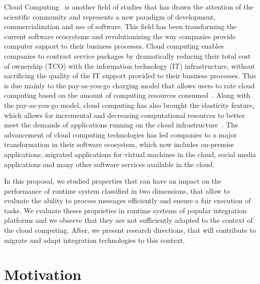 Cloud Computing~\cite{NIST:2011} is another field of studies that has drawn the attention of the scientific community and represents a new paradigm of development, commercialization and use of software. This field has been transforming the current software ecosystems and revolutionizing the way companies provide computer support to their business processes. Cloud computing enables companies to contract service packages by dramatically reducing their total cost of ownership (TCO) with the information technology (IT) infrastructure, without sacrificing the quality of the IT support provided to their business processes. This is due mainly to the pay-as-you-go charging model that allows users to rate cloud computing based on the amount of computing resources consumed~\cite{buyya:2009,SOUSA:2009}. Along with the pay-as-you-go model, cloud computing has also brought the elasticity feature, which allows for incremental and decreasing computational resources to better meet the demands of applications running on the cloud infrastructure~\cite{DIAS:2015}.
The advancement of cloud computing technologies has led companies to a major transformation in their software ecosystem, which now includes on-premise applications, migrated applications for virtual machines in the cloud, social media applications and many other software services available in the cloud. 

In this proposal, we studied properties that can have an impact on the performance of runtime system classified in two dimensions, that allow to evaluate the ability to process messages efficiently and ensure a fair execution of tasks. We evaluate theses proprieties in runtime systems of popular integration platforms and we observe that they are not sufficiently adapted to the context of the cloud computing. After, we present research directions, that will contribute to migrate and adapt integration technologies to this context.
\section{Motivation}

